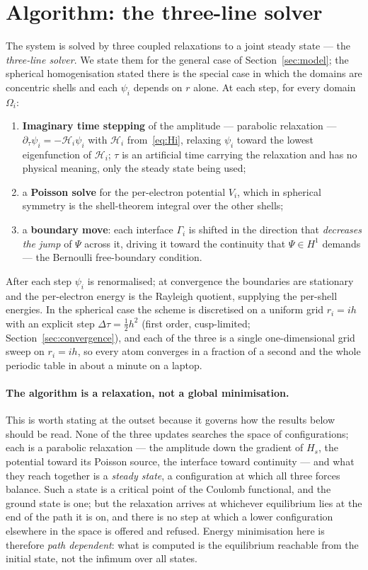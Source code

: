 \documentclass[11pt]{article}
\begin{document}
\section{Algorithm: the three-line solver}\label{sec:algorithm}

The system is solved by three coupled relaxations to a joint steady state --- the
\emph{three-line solver}. We state them for the general case of
Section~\ref{sec:model}; the spherical homogenisation stated there is the
special case in which the domains are concentric shells and each $\psi_i$ depends on $r$ alone.
At each step, for every domain $\Omega_i$:
\begin{enumerate}\setlength{\itemsep}{1pt}
\item \textbf{Imaginary time stepping} of the amplitude --- parabolic relaxation ---
$\partial_\tau \psi_i=-\mathcal{H}_i \psi_i$ with $\mathcal{H}_i$ from~\eqref{eq:Hi}, relaxing
$\psi_i$ toward the lowest eigenfunction of $\mathcal{H}_i$; $\tau$ is an artificial time
carrying the relaxation and has no physical meaning, only the steady state being used;
\item a \textbf{Poisson solve} for the per-electron potential $V_i$, which in spherical
symmetry is the shell-theorem integral over the other shells;
\item a \textbf{boundary move}: each interface $\Gamma_i$ is shifted in the direction that
\emph{decreases the jump} of $\Psi$ across it, driving it toward the continuity that
$\Psi\in H^1$ demands --- the Bernoulli free-boundary condition.
\end{enumerate}
After each step $\psi_i$ is renormalised; at convergence the boundaries are stationary and the
per-electron energy is the Rayleigh quotient, supplying the per-shell energies.
In the spherical case the scheme is discretised on a uniform grid $r_i=ih$ with an explicit
step $\Delta\tau=\tfrac12 h^2$ (first order, cusp-limited; Section~\ref{sec:convergence}), and
each of the three is a single one-dimensional grid sweep on $r_i=ih$, so every atom converges in a fraction of a second and the whole periodic table
in about a minute on a laptop.

\paragraph{The algorithm is a relaxation, not a global minimisation.} This is worth stating
at the outset because it governs how the results below should be read. None of the three
updates searches the space of configurations; each is a parabolic relaxation --- the
amplitude down the gradient of $H_s$, the potential toward its Poisson source, the interface
toward continuity --- and what they reach together is a \emph{steady state}, a configuration
at which all three forces balance. Such a state is a critical point of the Coulomb functional,
and the ground state is one; but the relaxation arrives at whichever equilibrium lies at the
end of the path it is on, and there is no step at which a lower configuration elsewhere in the
space is offered and refused. Energy minimisation here is therefore \emph{path dependent}:
what is computed is the equilibrium reachable from the initial state, not the infimum over all
states.
\end{document}
